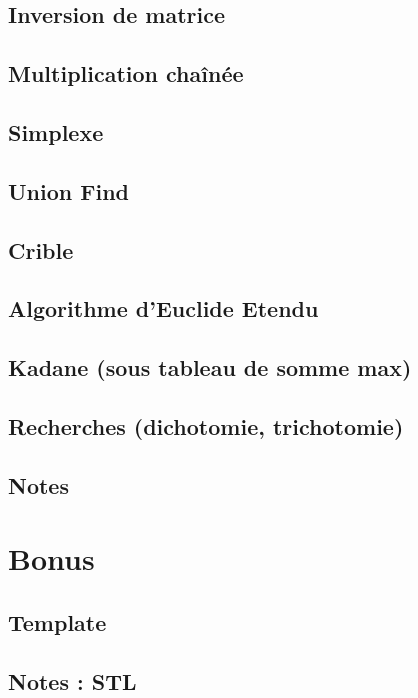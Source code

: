 \documentclass[12pt]{article}
\begin{document}
\subsection{Inversion de matrice}
{\scriptsize}

\subsection{Multiplication chaînée}
{\scriptsize}

\subsection{Simplexe}
{\scriptsize}
 
\subsection{Union Find}
{\scriptsize}

\subsection{Crible}
{\scriptsize}

\subsection{Algorithme d'Euclide Etendu}
{\scriptsize}

\subsection{Kadane (sous tableau de somme max)}
{\scriptsize}



\subsection{Recherches (dichotomie, trichotomie)}


\subsection{Notes}



\section{Bonus}
\subsection{Template}
{\scriptsize}

\subsection{Notes : STL}

\end{document}

